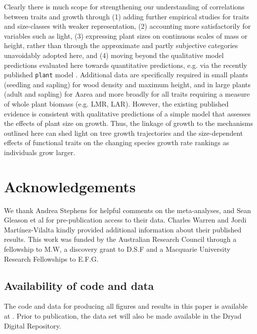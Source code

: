 \documentclass[a4paper,11pt]{article}
\begin{document}
Clearly there is much scope for strengthening our understanding of correlations between traits and growth through (1) adding further empirical studies for traits and size-classes with weaker representation, (2) accounting more satisfactorily for variables such as light, (3) expressing plant sizes on continuous scales of mass or height, rather than through the approximate and partly subjective categories unavoidably adopted here, and (4) moving beyond the qualitative model predictions evaluated here towards quantitative predictions, e.g. via the recently published \texttt{plant} model \citep{Falster-2016}. Additional data are specifically required in small plants (seedling and sapling) for wood density and maximum height, and in large plants (adult and sapling) for Aarea and more broadly for all traits requiring a measure of whole plant biomass (e.g. LMR, LAR). However, the existing published evidence is consistent with qualitative predictions of a simple model that assesses the effects of plant size on growth. Thus, the linkage of growth to the mechanisms outlined here can shed light on tree growth trajectories and the size-dependent effects of functional traits on the changing species growth rate rankings as individuals grow larger.

\section*{Acknowledgements}\label{Acknowledgment}

We thank Andrea Stephens for helpful comments on the meta-analyses, and Sean Gleason et al for pre-publication access to their data. Charles Warren and Jordi Mart{\'i}nez-Vilalta kindly provided additional information about their published results. This work was funded by the Australian Research Council through a fellowship to M.W, a discovery grant to D.S.F and a Macquarie University Research Fellowships to E.F.G.

\subsection*{Availability of code and data}\label{code}

The code and data for producing all figures and results in this paper is available at . Prior to publication, the data set will also be made available in the Dryad Digital Repository.

\linespread{1}
\label{references}
\end{document}
